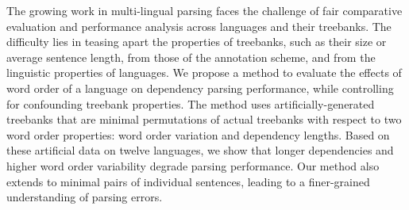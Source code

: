The growing work in multi-lingual parsing faces the challenge of fair comparative evaluation and performance analysis across languages and their treebanks. The difficulty lies in teasing apart the properties of treebanks, such as their size or average sentence length, from those of the annotation scheme, and from the linguistic properties of languages. We propose a method to evaluate the effects of word order of a language on dependency parsing performance, while controlling for confounding treebank properties. The method uses artificially-generated treebanks that are minimal permutations of actual treebanks with respect to two word order properties: word order variation and dependency lengths. Based on these artificial data on twelve languages, we show that longer dependencies and higher word order variability degrade parsing performance. Our method also extends to minimal pairs of individual sentences, leading to a finer-grained understanding of parsing errors.
